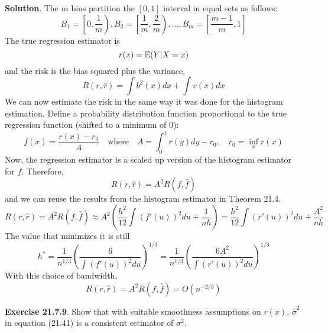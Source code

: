 \textbf{Solution}.
The \(m\) bins partition the \([0, 1]\) interval in equal sets as
follows:
\[
B_{1} = \left[0, \frac{1}{m} \right), B_{2} = \left[\frac{1}{m}, \frac{2}{m} \right), \dots, B_m = \left[\frac{m - 1}{m}, 1 \right]
\]
The true regression estimator is
\[
r(x) = \operatorname{\mathbb{E}}(Y | X = x)
\]
and the risk is the bias squared plus the variance,
\[
R(r, \hat{r}) = \int b^{2}(x) dx + \int v(x) dx
\]
We can now estimate the risk in the same way it was done for the
histogram estimation.
Define a probability distribution function proportional to the true
regression function (shifted to a minimum of 0):
\[
f(x) = \frac{r(x) - r_{0}}{A} \quad \text{where} \quad A = \int_{0}^{1} r(y) dy - r_{0}, \quad r_{0} = \inf_x r(x)
\]
Now, the regression estimator is a scaled up version of the histogram
estimator for \(f\). Therefore,
\[
R(r, \hat{r}) = A^{2} R(f, \hat{f})
\]
and we can reuse the results from the histogram estimator in Theorem
21.4.
\[
R(r, \hat{r}) = A^{2} R(f, \hat{f}) \approx A^{2} \left( \frac{h^{2}}{12} \int (f'(u))^{2} du + \frac{1}{nh} \right) = \frac{h^{2}}{12} \int (r'(u))^{2} du + \frac{A^{2}}{nh}
\]
The value that minimizes it is still
\[
h^{*} = \frac{1}{n^{1/3}} \left( \frac{6}{\int (f'(u))^{2} du} \right)^{1/3} = \frac{1}{n^{1/3}} \left( \frac{6A^{2}}{\int (r'(u))^{2} du} \right)^{1/3}
\]
With this choice of bandwidth,
\[
R(r, \hat{r}) = A^{2} R(f, \hat{f}) = O(n^{-2/3})
\]

\textbf{Exercise 21.7.9}. Show that with suitable smoothness assumptions
on \(r(x)\), \(\hat{\sigma}^{2}\) in equation (21.41) is a consistent
estimator of \(\sigma^{2}\).

